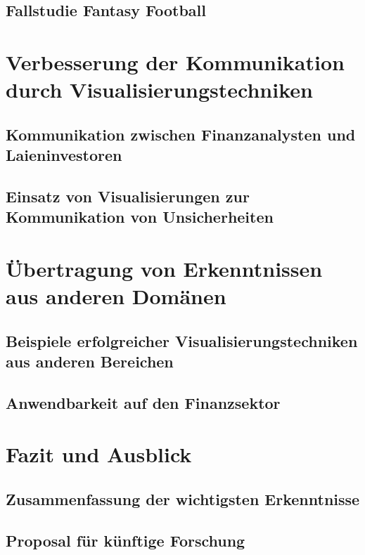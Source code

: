 \subsection{Fallstudie Fantasy Football}

\section{Verbesserung der Kommunikation durch Visualisierungstechniken}
\subsection{Kommunikation zwischen Finanzanalysten und Laieninvestoren}
\cite{Joslyn2021}
\subsection{Einsatz von Visualisierungen zur Kommunikation von Unsicherheiten}

\section{Übertragung von Erkenntnissen aus anderen Domänen}
\subsection{Beispiele erfolgreicher Visualisierungstechniken aus anderen Bereichen}
\cite{Boller2010}
\subsection{Anwendbarkeit auf den Finanzsektor}

\section{Fazit und Ausblick}
\subsection{Zusammenfassung der wichtigsten Erkenntnisse}
\subsection{Proposal für künftige Forschung}


